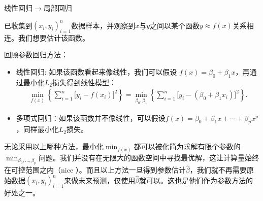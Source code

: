 \documentclass[10pt]{notes}
\begin{document}


\thispagestyle{firstpage}


\begin{center}
    \large 线性回归$\to$局部回归
\end{center}

\begin{setup}
    已收集到$(x_i,y_i)_{i=1}^n$数据样本，并观察到$x$与$y$之间以某个函数$y\approx f(x)$关系相连。我们想要估计该函数。
\end{setup}

\noindent
回顾参数回归方法：
\begin{itemize}
    \item 线性回归: 如果该函数看起来像线性，我们可以假设 $f(x)=\beta_0+\beta_1 x$，再通过最小化$L_2$损失得到线性模型：
    \begin{align}
        \min_{f(x)} \left\{\sum_{i=1}^{n} \Big[y_i-f(x_i)\Big]^2\right\} = \min_{\beta_0,\beta_1} \left\{\sum_{i=1}^{n} \Big[y_i-(\beta_0+\beta_1 x_i)\Big]^2\right\}.
        \label{eq-l2-loss-lm}
    \end{align}
    \item 多项式回归：如果该函数并不像线性，可以假设$f(x)=\beta_0+\beta_1 x+\cdots+\beta_p x^p$，同样最小化$L_2$损失。
\end{itemize}
\noindent 
无论采用以上哪种方法，最小化$\min_{f(x)}$都可以被化简为求解有限个参数的$\min_{\beta_0,\dots,\beta_p}$问题。我们并没有在无限大的函数空间中寻找最优解，这让计算量始终在可控范围之内（nice \smiley）。而且以上方法一旦得到参数估计$\hat{\beta}$，我们就不再需要原始数据$(x_i,y_i)_{i=1}^n$来做未来预测，仅使用$\hat{\beta}$就可以。这也是他们作为参数方法的好处之一。
\end{document}

